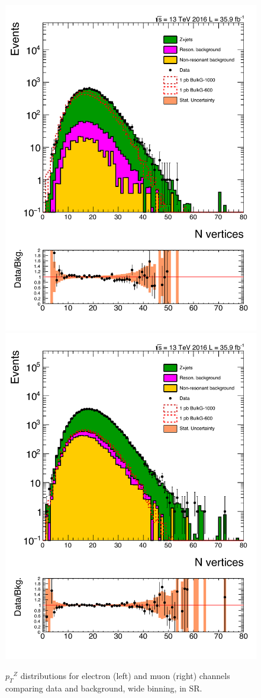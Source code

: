 \begin{figure}[htbp!]
\centering
\includegraphics[width=0.46\linewidth,page=9]{figures/ReMiniSummer16_DT_PhReMiniMCRcFixXsec_GMCPhPtWt_SRdPhiGT0p5_puWeightsummer16_muoneg_gjet_metfilter_unblind_el_log_1pb.pdf}
\includegraphics[width=0.46\linewidth,page=9]{figures/ReMiniSummer16_DT_PhReMiniMCRcFixXsec_GMCPhPtWt_SRdPhiGT0p5_puWeightsummer16_muoneg_gjet_metfilter_unblind_mu_log_1pb.pdf}
\caption{${p_T}^Z$ distributions for electron (left) and muon (right) channels
comparing data and background,
wide binning, in SR.}
\label{fig:SR_gjet_zpt_wide}
\end{figure}

